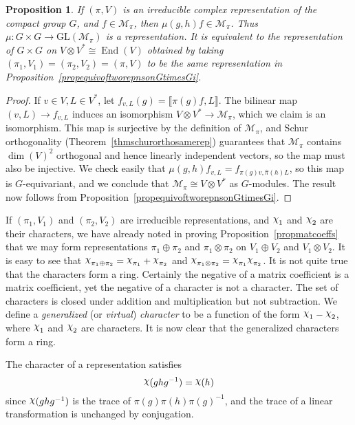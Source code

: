 \documentclass[12pt,reqno]{book}%
\newtheorem{proposition}{Proposition}[chapter]
\theoremstyle{definition}
\theoremstyle{remark}
\theoremstyle{theorem}
\theoremstyle{remark}
\newcommand{\mychi}{\raisebox{2pt}{$\chi$}}
\DeclareMathOperator{\End}{End}
\begin{document}
\begin{proposition}\label{propequivtworepnonGtimesGii}%
    If $(\pi, V)$ is an irreducible complex representation of the compact group $G$, and $f \in \mathscr{M}_\pi$, then $\mu(g, h)f \in \mathscr{M}_\pi$.
    Thus $\mu : G \times G \to \mathrm{GL}(\mathscr{M}_\pi)$ is a representation.
    It is equivalent to the representation of $G \times G$ on $V \otimes V^* \cong \End(V)$ obtained by taking $(\pi_1, V_1) = (\pi_2, V_2) = (\pi, V)$ to be the same representation in Proposition~\ref{propequivoftworepnsonGtimesGi}.
\end{proposition}%
\begin{proof}%
    If $v \in V, L \in V^*$, let $f_{v, L}(g) = {\llbracket \pi(g)f, L\rrbracket}$.
    The bilinear map $(v, L) \to f_{v, L}$ induces an isomorphism $V \otimes V^* \to \mathscr{M}_\pi$, which we claim is an isomorphism.
    This map is surjective by the definition of $\mathscr{M}_\pi$, and Schur orthogonality (Theorem~\ref{thmschurorthosamerep}) guarantees that $\mathscr{M}_\pi$ contains $\dim(V)^2$ orthogonal and hence linearly independent vectors, so the map must also be injective.
    We check easily that $\mu(g, h)f_{v, L} = f_{\pi(g)v, \widehat{\pi}(h)L}$, so this map is $G$-equivariant, and we conclude that $\mathscr{M}_\pi \cong V \otimes V^*$ as $G$-modules.
    The result now follows from Proposition~\ref{propequivoftworepnsonGtimesGi}.
\end{proof}%

If $(\pi_1, V_1)$ and $(\pi_2, V_2)$ are irreducible representations, and $\mychi_1$ and $\mychi_2$ are their characters, we have already noted in proving Proposition~\ref{propmatcoeffs} that we may form representations $\pi_1 \oplus \pi_2$ and $\pi_1 \otimes \pi_2$ on $V_1 \oplus V_2$ and $V_1 \otimes V_2$.
It is easy to see that $\mychi_{\pi_1 \oplus \pi_2} = \mychi_{\pi_1} + \mychi_{\pi_2}$ and $\mychi_{\pi_1 \otimes \pi_2} = \mychi_{\pi_1} \mychi_{\pi_2}$.
It is not quite true that the characters form a ring.
Certainly the negative of a matrix coefficient is a matrix coefficient, yet the negative of a character is not a character.
The set of characters is closed under addition and multiplication but not subtraction.
We define a \emph{generalized} (or \emph{virtual}) \emph{character} to be a function of the form $\mychi_1 - \mychi_2$, where $\mychi_1$ and $\mychi_2$ are characters.
It is now clear that the generalized characters form a ring.

The character of a representation satisfies
\[
    \mychi(ghg^{-1}) = \mychi(h)
\]
since $\mychi(ghg^{-1})$ is the trace of $\pi(g)\pi(h)\pi(g)^{-1}$, and the trace of a linear transformation is unchanged by conjugation.
\end{document}
